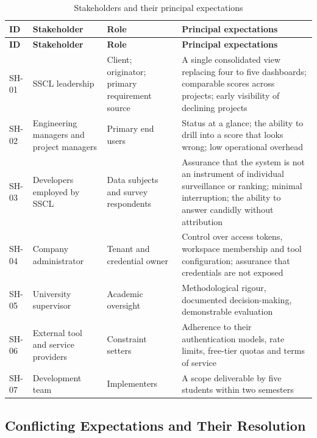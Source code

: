 \begin{longtable}{
  >{\raggedright\arraybackslash}p{}
  >{\raggedright\arraybackslash}p{}
  >{\raggedright\arraybackslash}p{}
  >{\raggedright\arraybackslash}p{}
}
\caption{Stakeholders and their principal expectations}
\label{tab:stakeholders}\\
\toprule
\textbf{ID} & \textbf{Stakeholder} & \textbf{Role} & \textbf{Principal expectations} 
\\
\midrule                                                                             
\endfirsthead
\toprule                                                                             
\textbf{ID} & \textbf{Stakeholder} & \textbf{Role} & \textbf{Principal expectations} \\
\midrule
\endhead
\bottomrule
\endlastfoot
SH-01 & SSCL leadership & Client; originator; primary requirement source
& A single consolidated view replacing four to five dashboards; comparable scores
across projects; early visibility of declining projects \\
\addlinespace
SH-02 & Engineering managers and project managers & Primary end users & Status at a glance; the ability to drill into a score that looks wrong; low operational overhead \\
\addlinespace
SH-03 & Developers employed by SSCL & Data subjects and survey respondents & Assurance that the system is not an instrument of individual surveillance or ranking; minimal interruption; the ability to answer candidly without attribution \\
\addlinespace
SH-04 & Company administrator & Tenant and credential owner & Control over access tokens, workspace membership and tool configuration; assurance that credentials are not exposed \\
\addlinespace
SH-05 & University supervisor & Academic oversight & Methodological rigour, documented decision-making, demonstrable evaluation \\
\addlinespace
SH-06 & External tool and service providers & Constraint setters & Adherence to their authentication models, rate limits, free-tier quotas and terms of service \\
\addlinespace
SH-07 & Development team & Implementers & A scope deliverable by five students within two semesters\\
\end{longtable}

\subsection{Conflicting Expectations and Their Resolution}
\label{subsec:conflicts}

